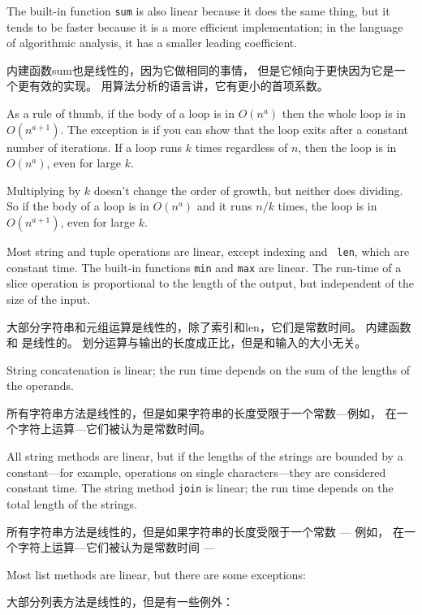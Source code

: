 The built-in function {\tt sum} is also linear because it does
the same thing, but it tends to be faster because it is a more
efficient implementation; in the language of algorithmic analysis,
it has a smaller leading coefficient.

内建函数sum也是线性的，因为它做相同的事情，
但是它倾向于更快因为它是一个更有效的实现。
用算法分析的语言讲，它有更小的首项系数。

As a rule of thumb, if the body of a loop is in $O(n^a)$ then
the whole loop is in $O(n^{a+1})$.  The exception is if you can
show that the loop exits after a constant number of iterations.
If a loop runs $k$ times regardless of $n$, then
the loop is in $O(n^a)$, even for large $k$.


Multiplying by $k$ doesn't change the order of growth, but neither
does dividing.  So if the body of a loop is in $O(n^a)$ and it runs
$n/k$ times, the loop is in $O(n^{a+1})$, even for large $k$.


Most string and tuple operations are linear, except indexing and {\tt
  len}, which are constant time.  The built-in functions {\tt min} and
{\tt max} are linear.  The run-time of a slice operation is
proportional to the length of the output, but independent of the size
of the input.

大部分字符串和元组运算是线性的，除了索引和len，它们是常数时间。
内建函数  和  是线性的。
划分运算与输出的长度成正比，但是和输入的大小无关。
  
  

String concatenation is linear; the run time depends on the sum
of the lengths of the operands.

所有字符串方法是线性的，但是如果字符串的长度受限于一个常数—例如，
在一个字符上运算—它们被认为是常数时间。

All string methods are linear, but if the lengths of
the strings are bounded by a constant---for example, operations on single
characters---they are considered constant time.
The string method {\tt join} is linear; the run time depends on
the total length of the strings.

所有字符串方法是线性的，但是如果字符串的长度受限于一个常数 --- 例如，
在一个字符上运算—它们被认为是常数时间 ---

Most list methods are linear, but there are some exceptions:

大部分列表方法是线性的，但是有一些例外：

